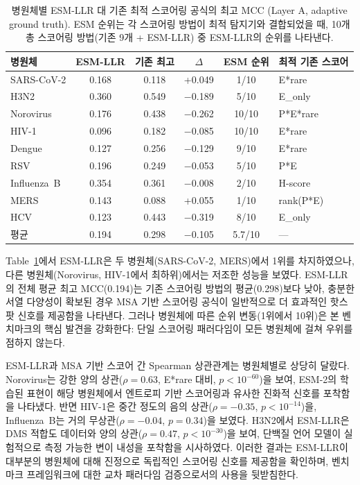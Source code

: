 \begin{table}[htbp]
\centering
\caption{병원체별 ESM-LLR 대 기존 최적 스코어링 공식의 최고 MCC (Layer A, adaptive ground truth). ESM 순위는 각 스코어링 방법이 최적 탐지기와 결합되었을 때, 10개 총 스코어링 방법(기존 9개 + ESM-LLR) 중 ESM-LLR의 순위를 나타낸다.}
\label{tab:esm_comparison}
\small
\begin{tabular}{lccccl}
\toprule
병원체 & ESM-LLR & 기존 최고 & $\Delta$ & ESM 순위 & 최적 기존 스코어 \\
\midrule
SARS-CoV-2 & 0.168 & 0.118 & +0.049 & 1/10 & E*rare \\
H3N2 & 0.360 & 0.549 & $-$0.189 & 5/10 & E\_only \\
Norovirus & 0.176 & 0.438 & $-$0.262 & 10/10 & P*E*rare \\
HIV-1 & 0.096 & 0.182 & $-$0.085 & 10/10 & E*rare \\
Dengue & 0.127 & 0.256 & $-$0.129 & 9/10 & E*rare \\
RSV & 0.196 & 0.249 & $-$0.053 & 5/10 & P*E \\
Influenza~B & 0.354 & 0.361 & $-$0.008 & 2/10 & H-score \\
MERS & 0.143 & 0.088 & +0.055 & 1/10 & rank(P*E) \\
HCV & 0.123 & 0.443 & $-$0.319 & 8/10 & E\_only \\
\midrule
평균 & 0.194 & 0.298 & $-$0.105 & 5.7/10 & --- \\
\bottomrule
\end{tabular}
\end{table}

Table~\ref{tab:esm_comparison}에서 ESM-LLR은 두 병원체(SARS-CoV-2, MERS)에서 1위를 차지하였으나, 다른 병원체(Norovirus, HIV-1에서 최하위)에서는 저조한 성능을 보였다. ESM-LLR의 전체 평균 최고 MCC(0.194)는 기존 스코어링 방법의 평균(0.298)보다 낮아, 충분한 서열 다양성이 확보된 경우 MSA 기반 스코어링 공식이 일반적으로 더 효과적인 핫스팟 신호를 제공함을 나타낸다. 그러나 병원체에 따른 순위 변동(1위에서 10위)은 본 벤치마크의 핵심 발견을 강화한다: 단일 스코어링 패러다임이 모든 병원체에 걸쳐 우위를 점하지 않는다.

ESM-LLR과 MSA 기반 스코어 간 Spearman 상관관계는 병원체별로 상당히 달랐다. Norovirus는 강한 양의 상관($\rho = 0.63$, E*rare 대비, $p < 10^{-60}$)을 보여, ESM-2의 학습된 표현이 해당 병원체에서 엔트로피 기반 스코어링과 유사한 진화적 신호를 포착함을 나타냈다. 반면 HIV-1은 중간 정도의 음의 상관($\rho = -0.35$, $p < 10^{-14}$)을, Influenza~B는 거의 무상관($\rho = -0.04$, $p = 0.34$)을 보였다. H3N2에서 ESM-LLR은 DMS 적합도 데이터와 양의 상관($\rho = 0.47$, $p < 10^{-30}$)을 보여, 단백질 언어 모델이 실험적으로 측정 가능한 변이 내성을 포착함을 시사하였다. 이러한 결과는 ESM-LLR이 대부분의 병원체에 대해 진정으로 독립적인 스코어링 신호를 제공함을 확인하며, 벤치마크 프레임워크에 대한 교차 패러다임 검증으로서의 사용을 뒷받침한다.


